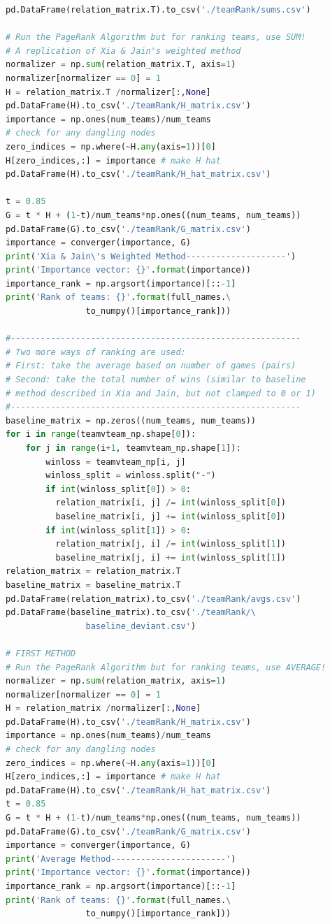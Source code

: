 \documentclass[12pt]{article}%
\begin{document}
\begin{lstlisting}[language=Python]
pd.DataFrame(relation_matrix.T).to_csv('./teamRank/sums.csv')

# Run the PageRank Algorithm but for ranking teams, use SUM!
# A replication of Xia & Jain's weighted method
normalizer = np.sum(relation_matrix.T, axis=1)
normalizer[normalizer == 0] = 1
H = relation_matrix.T /normalizer[:,None]
pd.DataFrame(H).to_csv('./teamRank/H_matrix.csv')
importance = np.ones(num_teams)/num_teams
# check for any dangling nodes
zero_indices = np.where(~H.any(axis=1))[0]
H[zero_indices,:] = importance # make H hat
pd.DataFrame(H).to_csv('./teamRank/H_hat_matrix.csv')

t = 0.85
G = t * H + (1-t)/num_teams*np.ones((num_teams, num_teams))
pd.DataFrame(G).to_csv('./teamRank/G_matrix.csv')
importance = converger(importance, G)
print('Xia & Jain\'s Weighted Method--------------------')
print('Importance vector: {}'.format(importance))
importance_rank = np.argsort(importance)[::-1]
print('Rank of teams: {}'.format(full_names.\
				to_numpy()[importance_rank]))

#----------------------------------------------------------
# Two more ways of ranking are used:
# First: take the average based on number of games (pairs)
# Second: take the total number of wins (similar to baseline
# method described in Xia and Jain, but not clamped to 0 or 1)
#----------------------------------------------------------
baseline_matrix = np.zeros((num_teams, num_teams))
for i in range(teamvteam_np.shape[0]):
	for j in range(i+1, teamvteam_np.shape[1]):
		winloss = teamvteam_np[i, j]
		winloss_split = winloss.split("-")
		if int(winloss_split[0]) > 0:
		  relation_matrix[i, j] /= int(winloss_split[0])
		  baseline_matrix[i, j] += int(winloss_split[0])
		if int(winloss_split[1]) > 0:
		  relation_matrix[j, i] /= int(winloss_split[1])
		  baseline_matrix[j, i] += int(winloss_split[1])
relation_matrix = relation_matrix.T 
baseline_matrix = baseline_matrix.T 
pd.DataFrame(relation_matrix).to_csv('./teamRank/avgs.csv')
pd.DataFrame(baseline_matrix).to_csv('./teamRank/\
				baseline_deviant.csv')

# FIRST METHOD
# Run the PageRank Algorithm but for ranking teams, use AVERAGE!
normalizer = np.sum(relation_matrix, axis=1)
normalizer[normalizer == 0] = 1
H = relation_matrix /normalizer[:,None]
pd.DataFrame(H).to_csv('./teamRank/H_matrix.csv')
importance = np.ones(num_teams)/num_teams
# check for any dangling nodes
zero_indices = np.where(~H.any(axis=1))[0] 
H[zero_indices,:] = importance # make H hat
pd.DataFrame(H).to_csv('./teamRank/H_hat_matrix.csv')
t = 0.85
G = t * H + (1-t)/num_teams*np.ones((num_teams, num_teams))
pd.DataFrame(G).to_csv('./teamRank/G_matrix.csv')
importance = converger(importance, G)
print('Average Method-----------------------')
print('Importance vector: {}'.format(importance))
importance_rank = np.argsort(importance)[::-1]
print('Rank of teams: {}'.format(full_names.\
				to_numpy()[importance_rank]))


\end{lstlisting}
\end{document}
